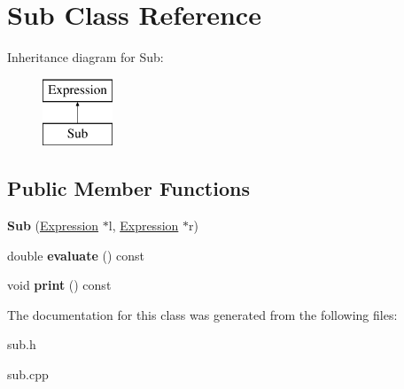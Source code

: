 \hypertarget{class_sub}{}\section{Sub Class Reference}
\label{class_sub}
Inheritance diagram for Sub\+:\begin{figure}[H]
\begin{center}
\leavevmode
\includegraphics[height=2.000000cm]{class_sub}
\end{center}
\end{figure}
\subsection*{Public Member Functions}
\begin{DoxyCompactItemize}
\item 
\mbox{\label{class_sub_a0156785212e8c6b36f9ca03c13ce2f0a}} 
{\bfseries Sub} (\hyperlink{class_expression}{Expression} $\ast$l, \hyperlink{class_expression}{Expression} $\ast$r)
\item 
\mbox{\label{class_sub_a15b87b081136f533a993a92ac01ec11b}} 
double {\bfseries evaluate} () const
\item 
\mbox{\label{class_sub_a2e7c967c1fdee5e7eca51ca36feb26bc}} 
void {\bfseries print} () const
\end{DoxyCompactItemize}


The documentation for this class was generated from the following files\+:\begin{DoxyCompactItemize}
\item 
sub.\+h\item 
sub.\+cpp\end{DoxyCompactItemize}
